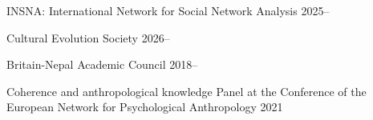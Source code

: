 


\begin{cvmemberships}

  \cvmembership
    {INSNA: International Network for Social Network Analysis} %
    {2025--} %

  \cvmembership
    {Cultural Evolution Society} %
    {2026--} %


  \cvmembership
    {Britain-Nepal Academic Council} %
    {2018--} %

\end{cvmemberships}


\begin{cvexperiences}

  \cvexperience
    {Coherence and anthropological knowledge} %
    {Panel at the Conference of the European Network for Psychological Anthropology} %
    {2021} %

\end{cvexperiences}

